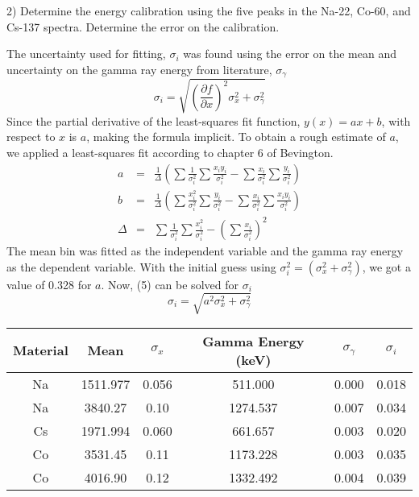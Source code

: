 \documentclass[10pt]{article}
\begin{document}
\begin{flushleft}
2) Determine the energy calibration using the five peaks in the Na-22, Co-60, and Cs-137 spectra. Determine the error on the calibration.
\end{flushleft}
The uncertainty used for fitting, $\sigma_i$ was found using the error on the mean and uncertainty on the gamma ray energy from literature, $\sigma_\gamma$
\begin{equation}
\sigma_i = \sqrt{\left(\frac{\partial f}{\partial x}\right)^2\sigma_x^2+\sigma_{\gamma}^2}
\end{equation}
Since the partial derivative of the least-squares fit function, $y(x)=ax+b$, with respect to $x$ is $a$, making the formula implicit. To obtain a rough estimate of $a$, we applied  a least-squares fit according to chapter 6 of Bevington.\cite{bevington}
\begin{eqnarray}
a &=& \frac{1}{\Delta}\left(\sum\frac{1}{\sigma_i^2}\sum\frac{x_i y_i}{\sigma_i^2}-\sum \frac{x_i}{\sigma_i^2}\sum\frac{y_i}{\sigma_i^2}\right) \\
b &=& \frac{1}{\Delta}\left(\sum\frac{x_i^2}{\sigma_i^2}\sum\frac{y_i}{\sigma_i^2}-\sum\frac{x_i}{\sigma_i^2}\sum\frac{x_i y_i}{\sigma_i^2}\right) \\
\Delta &=& \sum\frac{1}{\sigma_i^2}\sum\frac{x_i^2}{\sigma_i^2}-\left(\sum\frac{x_i}{\sigma_i^2}\right)^2
\end{eqnarray}
The mean bin was fitted as the independent variable and the gamma ray energy as the dependent variable. With the initial guess using $\sigma_i^2 =(\sigma_x^2+\sigma_{\gamma}^2)$, we got a value of 0.328 for $a$. Now, (5) can be solved for $\sigma_i$
\begin{equation}
\sigma_i = \sqrt{a^2\sigma_x^2+\sigma_{\gamma}^2}
\end{equation}
\begin{center}
\begin{tabular}{|c|c|c|c|c|c|}
\hline 
Material & Mean & $\sigma_x$ & Gamma Energy (keV)\cite{sonzogni} & $\sigma_\gamma$ & $\sigma_i$ \\ 
\hline 
Na & 1511.977 & 0.056 & 511.000 & 0.000 & 0.018 \\ 
\hline 
Na & 3840.27 & 0.10 & 1274.537 & 0.007 & 0.034\\ 
\hline 
Cs & 1971.994 & 0.060 & 661.657 & 0.003 & 0.020 \\ 
\hline 
Co & 3531.45 & 0.11 & 1173.228 & 0.003 & 0.035 \\ 
\hline 
Co & 4016.90 & 0.12 & 1332.492 & 0.004 & 0.039 \\ 
\hline 
\end{tabular}
\end{center}
\end{document}
